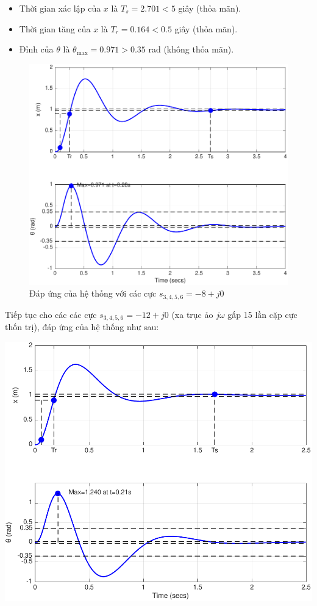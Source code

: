 \documentclass[12pt,a4paper]{article}
\begin{document}
\begin{itemize}
    \item Thời gian xác lập của $x$ là $T_s = 2.701 < 5$ giây (thỏa mãn).
    \item Thời gian tăng của $x$ là $T_r = 0.164 < 0.5$ giây (thỏa mãn).
    \item Đỉnh của $\theta$ là $\theta_{\max} = 0.971 > 0.35$ rad (không thỏa mãn).
\end{itemize}

\newpage 

\begin{figure}[ht]
    \centering
    \includegraphics[width=0.75\linewidth]{ss10.pdf}
    \caption{Đáp ứng của hệ thống với các cực $s_{3,4,5,6} = -8 +j0$}
\end{figure}

Tiếp tục cho các các cực $s_{3,4,5,6} = -12 +j0$ (xa trục ảo $j\omega$ gấp 15 lần cặp cực thốn trị), đáp ứng của hệ thống như sau:

\vspace{2\baselineskip}

{
    \centering
    \captionsetup{type=figure}
    \includegraphics[width=0.75\linewidth]{ss15.pdf}
    \caption{Đáp ứng của hệ thống với các cực $s_{3,4,5,6} = -12 +j0$}
}
\end{document}
